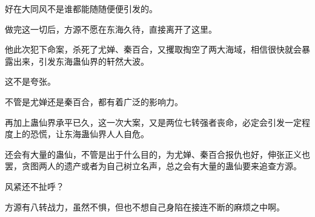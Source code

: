 \begin{this_body}
好在大同风不是谁都能随随便便引发的。

做完这一切后，方源不愿在东海久待，直接离开了这里。

他此次犯下命案，杀死了尤婵、秦百合，又攫取掏空了两大海域，相信很快就会暴露出来，引发东海蛊仙界的轩然大波。

这不是夸张。

不管是尤婵还是秦百合，都有着广泛的影响力。

再加上蛊仙界承平已久，这一次大案，又是两位七转强者丧命，必定会引发一定程度上的恐慌，让东海蛊仙界人人自危。

还会有大量的蛊仙，不管是出于什么目的，为尤婵、秦百合报仇也好，伸张正义也罢，贪图两人的遗产或者为自己树立名声，总之会有大量的蛊仙要来追查方源。

风紧还不扯呼？

方源有八转战力，虽然不惧，但也不想自己身陷在接连不断的麻烦之中啊。

\end{this_body}

